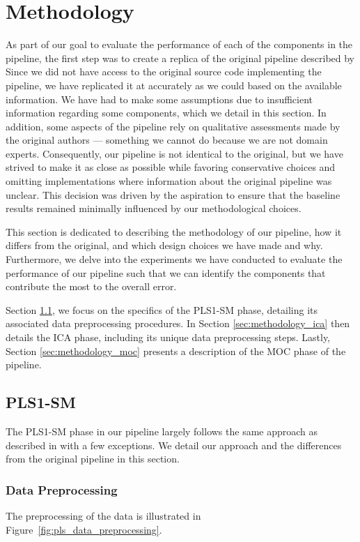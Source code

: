 \section{Methodology}\label{sec:methodology}
As part of our goal to evaluate the performance of each of the components in the pipeline, the first step was to create a replica of the original pipeline described by \citet{cleggRecalibrationMarsScience2017}
Since we did not have access to the original source code implementing the pipeline, we have replicated it at accurately as we could based on the available information.
We have had to make some assumptions due to insufficient information regarding some components, which we detail in this section.
In addition, some aspects of the pipeline rely on qualitative assessments made by the original authors --- something we cannot do because we are not domain experts.
Consequently, our pipeline is not identical to the original, but we have strived to make it as close as possible while favoring conservative choices and omitting implementations where information about the original pipeline was unclear.
This decision was driven by the aspiration to ensure that the baseline results remained minimally influenced by our methodological choices.

This section is dedicated to describing the methodology of our pipeline, how it differs from the original, and which design choices we have made and why.
Furthermore, we delve into the experiments we have conducted to evaluate the performance of our pipeline such that we can identify the components that contribute the most to the overall error.

Section \ref{sec:methodology_pls1}, we focus on the specifics of the PLS1-SM phase, detailing its associated data preprocessing procedures.
In Section \ref{sec:methodology_ica} then details the ICA phase, including its unique data preprocessing steps.
Lastly, Section \ref{sec:methodology_moc} presents a description of the MOC phase of the pipeline.

\subsection{PLS1-SM}\label{sec:methodology_pls1}
The PLS1-SM phase in our pipeline largely follows the same approach as described in \citet{andersonImprovedAccuracyQuantitative2017} with a few exceptions.
We detail our approach and the differences from the original pipeline in this section.

\subsubsection{Data Preprocessing}\label{sec:pls1_data_preprocessing}
The preprocessing of the data is illustrated in Figure~\ref{fig:pls_data_preprocessing}.

